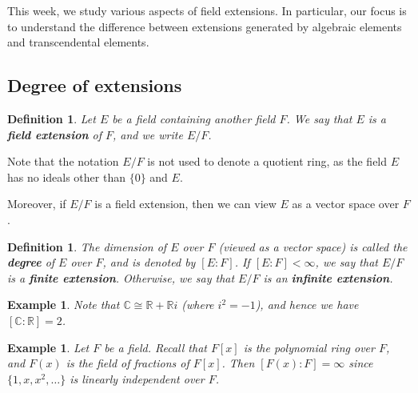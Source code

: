 \documentclass[10pt]{article}
\newcommand{\R}{\mathbb{R}}
\newcommand{\C}{\mathbb{C}}
\theoremstyle{newstyle}
\newtheorem{defn}[thm]{Definition}
\newtheorem{exmp}[thm]{Example}
\begin{document}
This week, we study various aspects of field extensions. In particular, our focus is to understand
the difference between extensions generated by algebraic elements and transcendental elements.

\subsection{Degree of extensions}

\begin{defn}
Let $E$ be a field containing another field $F$. We say that $E$ is a {\bf field extension} 
of $F$, and we write $E/F$.
\end{defn}

Note that the notation $E/F$ is not used to denote a quotient ring, as the field $E$ has no ideals
other than $\{0\}$ and $E$.

Moreover, if $E/F$ is a field extension, then we can view $E$ as a vector space over $F$.

\begin{defn}
The dimension of $E$ over $F$ (viewed as a vector space) is called the {\bf degree} of $E$ over $F$, 
and is denoted by $[E : F]$. If $[E : F] < \infty$, we say that $E/F$ is a {\bf finite extension}. 
Otherwise, we say that $E/F$ is an {\bf infinite extension}.
\end{defn}

\begin{exmp}
Note that $\C \cong \R+\R i$ (where $i^2=-1$), and hence we have $[\C : \R] = 2$.
\end{exmp}

\begin{exmp}
Let $F$ be a field. 
Recall that $F[x]$ is the polynomial ring over $F$, and $F(x)$ is the field of fractions of 
$F[x]$. Then $[F(x) : F] = \infty$ since $\{1, x, x^2, \dots\}$ is linearly independent over $F$.
\end{exmp}
\end{document}
